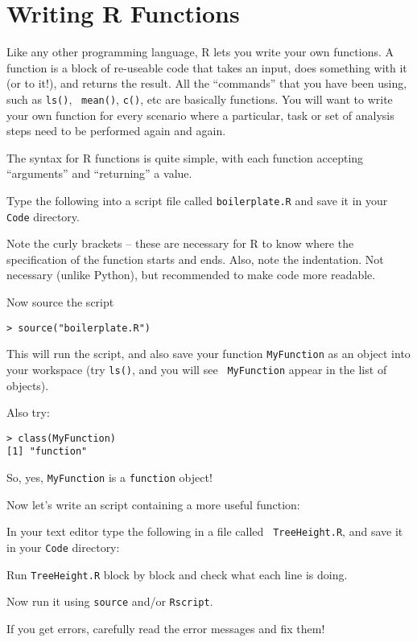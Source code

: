 \section{Writing R Functions}
Like any other programming language, R lets you write your own 
functions. A function is a block of re-useable code that takes an 
input, does something with it (or to it!), and returns the result. All 
the ``commands'' that you have been using, such as {\tt ls()}, {\tt 
mean()}, {\tt c()}, etc are basically functions. You will want to write 
your own function for every scenario where a particular, task or set 
of analysis steps need to be performed again and again.   

The syntax for R functions is quite simple, with each function accepting 
``arguments'' and ``returning'' a value. 

Type the following into a script file called  {\tt boilerplate.R} and 
save it in your {\tt Code} directory.
 


Note the curly brackets -- these are necessary for R to know where the 
specification of the function starts and ends. Also, note the 
indentation. Not necessary (unlike Python), but recommended to make
code more readable.

Now source the script
\begin{lstlisting}
> source("boilerplate.R")	
\end{lstlisting}
This will run the script, and also save your function {\tt MyFunction} 
as an object into your workspace (try {\tt ls()}, and you will see {\tt 
MyFunction} appear in the list of objects). 

Also try: 
\begin{lstlisting}
> class(MyFunction)
[1] "function"	
\end{lstlisting}
So, yes, {\tt MyFunction} is a {\tt function} object! 

Now let's write an script containing a more useful function:
\begin{compactitem}[$\quad\star$]
	\item In your text editor type the following in a file called {\tt 
	TreeHeight.R}, and save it in your {\tt Code} directory:
\end{compactitem}



\begin{compactitem}[$\quad\star$]
	\item Run {\tt TreeHeight.R} block by block and check what each line 
	is doing.
	\item Now run it using {\tt source} and/or {\tt Rscript}.
	\item If you get errors, carefully read the error messages and fix 
	them!
\end{compactitem}

